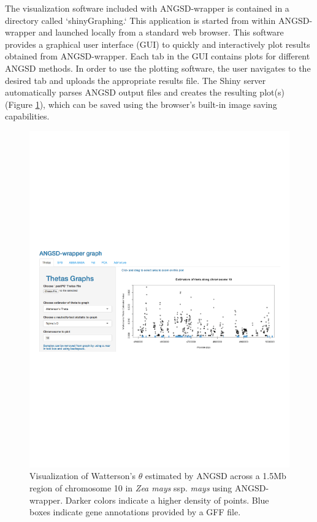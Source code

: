 \documentclass[10pt,a4paper]{article}
\begin{document}
The visualization software included with ANGSD-wrapper is contained in a directory called `shinyGraphing.`
This application is started from within ANGSD-wrapper and launched locally from a standard web browser. 
This software provides a graphical user interface (GUI) to quickly and interactively plot results obtained from ANGSD-wrapper.  
Each tab in the GUI contains plots for different ANGSD methods.
In order to use the plotting software, the user navigates to the desired tab and uploads the appropriate results file. 
The Shiny server automatically parses ANGSD output files and creates the resulting plot(s) (Figure \ref{fig:theta}), which can be saved using the browser's built-in image saving capabilities.

\begin{figure}
\centering
\caption{Visualization of Watterson's $\theta$ estimated by ANGSD across a 1.5Mb region of chromosome 10 in {\it Zea mays} ssp. {\it mays} using ANGSD-wrapper. Darker colors indicate a higher density of points. Blue boxes indicate gene annotations provided by a GFF file. \label{fig:theta} }
\includegraphics[width=0.8\linewidth]{figures/fig1.pdf}
\end{figure}
\end{document}
